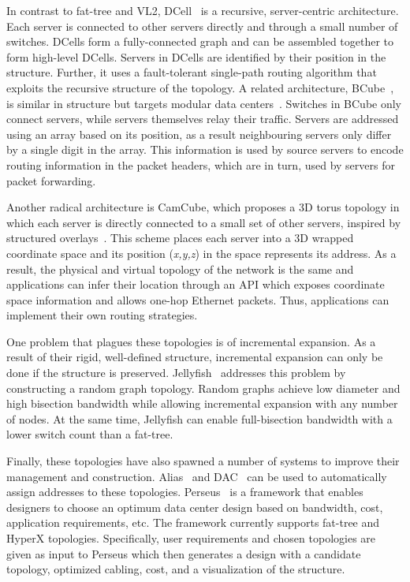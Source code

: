 \documentclass[a4paper,12pt,twoside,openright]{report}
\begin{document}
In contrast to fat-tree and VL2, DCell~\cite{Guo:2008:DSF} is a recursive,
server-centric architecture. Each server is connected to other servers directly
and through a small number of switches. DCells form a fully-connected graph and
can be assembled together to form high-level DCells. Servers in DCells are
identified by their position in the structure. Further, it uses a fault-tolerant
single-path routing algorithm that exploits the recursive structure of the
topology. A related architecture, BCube~\cite{Guo:2009:BHP}, is similar in
structure but targets modular data centers~\cite{Vishwanath:2009:MDC}. Switches
in BCube only connect servers, while servers themselves relay their traffic.
Servers are addressed using an array based on its position, as a result
neighbouring servers only differ by a single digit in the array. This
information is used by source servers to encode routing information in the
packet headers, which are in turn, used by servers for packet forwarding.

Another radical architecture is CamCube, which proposes a 3D torus topology in
which each server is directly connected to a small set of other servers,
inspired by structured overlays~\cite{Abu-Libdeh:2010:SRF}. This scheme places
each server into a 3D wrapped coordinate space and its position (\emph{x,y,z})
in the space represents its address. As a result, the physical and virtual
topology of the network is the same and applications can infer their location
through an API which exposes coordinate space information and allows one-hop
Ethernet packets. Thus, applications can implement their own routing strategies.

One problem that plagues these topologies is of incremental expansion. As a
result of their rigid, well-defined structure, incremental expansion can only be
done if the structure is preserved. Jellyfish~\cite{Singla:2011:JND} addresses
this problem by constructing a random graph topology. Random graphs achieve low
diameter and high bisection bandwidth while allowing incremental expansion with
any number of nodes. At the same time, Jellyfish can enable full-bisection
bandwidth with a lower switch count than a fat-tree.

Finally, these topologies have also spawned a number of systems to improve their
management and construction. Alias~\cite{Walraed-Sullivan:2011} and
DAC~\cite{Chen:2010:GAA} can be used to automatically assign addresses to these
topologies. Perseus~\cite{Mudigonda:2011:TFC} is a framework that enables
designers to choose an optimum data center design based on bandwidth, cost,
application requirements, etc. The framework currently supports fat-tree and
HyperX topologies. Specifically, user requirements and chosen topologies are
given as input to Perseus which then generates a design with a candidate
topology, optimized cabling, cost, and a visualization of the structure.
\end{document}
